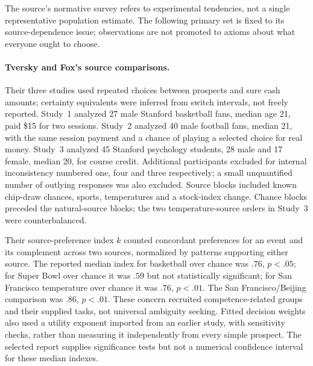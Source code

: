 The source's normative survey refers to experimental tendencies, not a
single representative population estimate. The following primary set
is fixed to its source-dependence issue; observations are not promoted
to axioms about what everyone ought to choose.

\paragraph{Tversky and Fox's source comparisons.}
Their three studies used repeated choices between prospects and sure
cash amounts; certainty equivalents were inferred from switch intervals,
not freely reported. Study~1 analyzed 27 male Stanford basketball fans,
median age 21, paid \$15 for two sessions. Study~2 analyzed 40 male
football fans, median 21, with the same session payment and a chance of
playing a selected choice for real money. Study~3 analyzed 45 Stanford
psychology students, 28 male and 17 female, median 20, for course credit.
Additional participants excluded for internal inconsistency numbered
one, four and three respectively; a small unquantified number of outlying
responses was also excluded. Source blocks included known chip-draw
chances, sports, temperatures and a stock-index change. Chance blocks
preceded the natural-source blocks; the two temperature-source orders
in Study~3 were counterbalanced.
\cite[pp.~272--274]{TverskyFox1995Weighing}

Their source-preference index \(k\) counted concordant preferences
for an event and its complement across two sources, normalized by
patterns supporting either source. The reported median index for
basketball over chance was \(.76\), \(p<.05\); for Super Bowl
over chance it was \(.59\) but not statistically significant;
for San Francisco temperature over chance it was \(.76\), \(p<.01\).
The San Francisco/Beijing comparison was \(.86\), \(p<.01\).
These concern recruited competence-related groups and their supplied
tasks, not universal ambiguity seeking. Fitted decision weights also
used a utility exponent imported from an earlier study, with sensitivity
checks, rather than measuring it independently from every simple
prospect. The selected report supplies significance tests but not a
numerical confidence interval for these median indexes.
\cite[pp.~274, 280--282]{TverskyFox1995Weighing}

